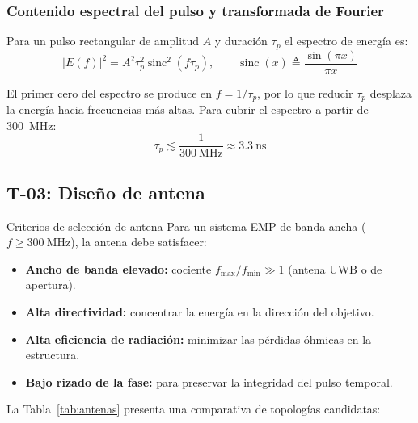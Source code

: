 \documentclass[11pt,a4paper]{article}
\DeclareMathOperator{\sinc}{sinc}
\begin{document}
\subsubsection{Contenido espectral del pulso y transformada de Fourier}

Para un pulso rectangular de amplitud $A$ y duración $\tau_p$ el espectro de energía es:
\begin{equation}
  |E(f)|^2 = A^2 \tau_p^2 \sinc^2(f \tau_p), \qquad \sinc(x) \triangleq \frac{\sin(\pi x)}{\pi x}
  \label{eq:espectro}
\end{equation}

El primer cero del espectro se produce en $f = 1/\tau_p$, por lo que reducir $\tau_p$ desplaza
la energía hacia frecuencias más altas. Para cubrir el espectro a partir de \SI{300}{\mega\hertz}:
\[
  \tau_p \lesssim \frac{1}{\SI{300}{\mega\hertz}} \approx \SI{3.3}{\nano\second}
\]

\subsection{T-03: Diseño de antena}

\begin{tareabox}{Criterios de selección de antena}
Para un sistema EMP de banda ancha ($f \geq \SI{300}{\mega\hertz}$), la antena debe satisfacer:
\begin{itemize}
  \item \textbf{Ancho de banda elevado:} cociente $f_{\max}/f_{\min} \gg 1$ (antena UWB o de apertura).
  \item \textbf{Alta directividad:} concentrar la energía en la dirección del objetivo.
  \item \textbf{Alta eficiencia de radiación:} minimizar las pérdidas óhmicas en la estructura.
  \item \textbf{Bajo rizado de la fase:} para preservar la integridad del pulso temporal.
\end{itemize}
\end{tareabox}

\vspace{6pt}

\noindent La Tabla~\ref{tab:antenas} presenta una comparativa de topologías candidatas:
\end{document}
